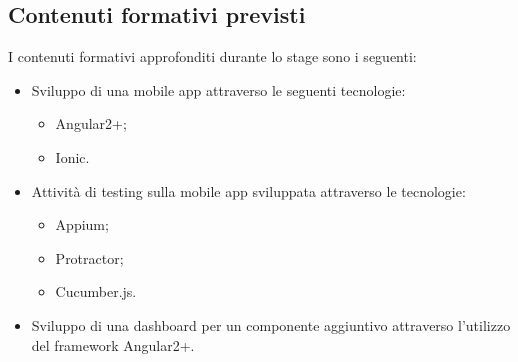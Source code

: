 \subsection{Contenuti formativi previsti}
I contenuti formativi approfonditi durante lo stage sono i seguenti:
\begin{itemize}
	\item Sviluppo di una mobile app attraverso le seguenti tecnologie:
	\begin{itemize}
		\item Angular2+;
		\item Ionic.
	\end{itemize}
	\item Attività di testing sulla mobile app sviluppata attraverso le tecnologie:
	\begin{itemize}
		\item Appium;
		\item Protractor;
		\item Cucumber.js.
	\end{itemize}
	\item Sviluppo di una dashboard per un componente aggiuntivo attraverso l'utilizzo del framework Angular2+. 
\end{itemize}
